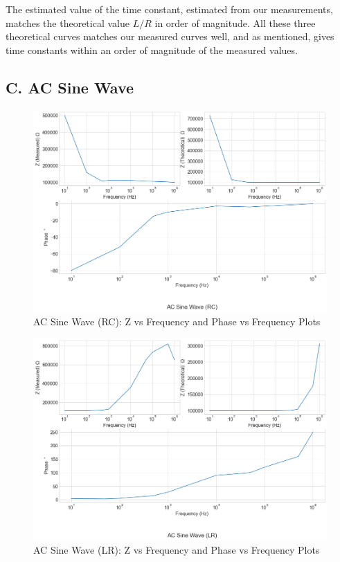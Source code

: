 \documentclass[a4paper,12pt]{article}
\begin{document}
The estimated value of the time constant, estimated from our measurements, matches the theoretical value $L/R$ in order of magnitude. 
All these three theoretical curves matches our measured curves well, and as mentioned, gives time constants within an order of magnitude of the measured values.

\subsection*{C. AC Sine Wave}

\begin{figure}[H]
  \centering
  \includegraphics[width=0.8\linewidth]{../code/AC Sine Wave (RC).png}    
  \caption{AC Sine Wave (RC): Z vs Frequency and Phase vs Frequency Plots}
  \label{Combined_RC_AC}
\end{figure}

\begin{figure}[H]
  \centering
  \includegraphics[width=0.8\linewidth]{../code/AC Sine Wave (LR).png}    
    \caption{AC Sine Wave (LR): Z vs Frequency and Phase vs Frequency Plots}
    \label{Combined_LR_AC}
\end{figure}
\end{document}
